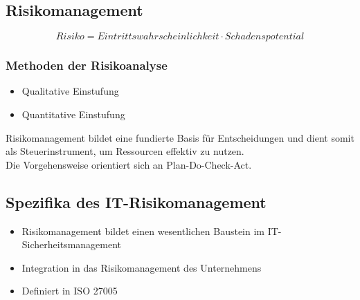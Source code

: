 \subsection{Risikomanagement}
\[Risiko = Eintrittswahrscheinlichkeit\cdot Schadenspotential\]

\subsubsection{Methoden der Risikoanalyse}
\begin{itemize}
	\item Qualitative Einstufung
	\item Quantitative Einstufung
\end{itemize}

Risikomanagement bildet eine fundierte Basis für Entscheidungen und dient somit als Steuerinstrument, um Ressourcen effektiv zu nutzen.\\
Die Vorgehensweise orientiert sich an Plan-Do-Check-Act.

\subsection{Spezifika des IT-Risikomanagement}
\begin{itemize}
	\item Risikomanagement bildet einen wesentlichen Baustein im IT-Sicherheitsmanagement
	\item Integration in das Risikomanagement des Unternehmens
	\item Definiert in ISO 27005
\end{itemize}

